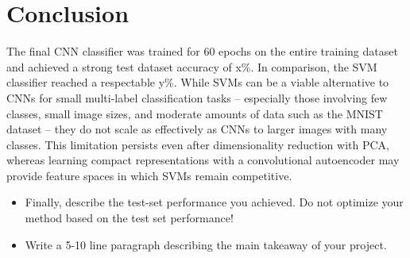 \documentclass[a4, 10 pt, conference]{ieeeconf}  %
\begin{document}
\section{Conclusion}
\label{sec:con}

The final CNN classifier was trained for 60 epochs on the entire training 
dataset and achieved a strong test dataset accuracy of x\%. In comparison, 
the SVM classifier reached a respectable y\%. While SVMs can be a viable 
alternative to CNNs for small multi-label classification tasks -- especially 
those involving few classes, small image sizes, and moderate amounts of 
data such as the MNIST dataset -- they do not scale as effectively as CNNs 
to larger images with many classes. This limitation persists even after 
dimensionality reduction with PCA, whereas learning compact representations 
with a convolutional autoencoder may provide feature spaces in which SVMs remain competitive.


{\color{blue}

  \begin{itemize}
  \item Finally, describe the test-set performance you achieved. Do not
    optimize your method based on the test set performance!
  \item Write a 5-10 line paragraph describing the main takeaway of your project.
  \end{itemize}

}

\end{document}
